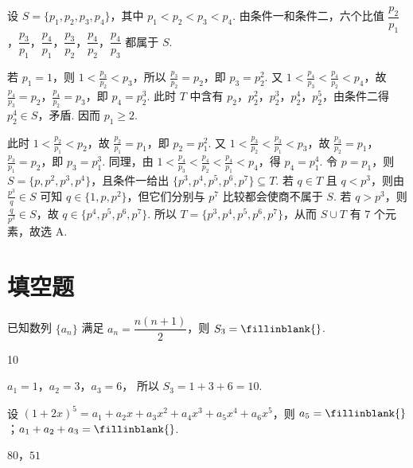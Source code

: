 \begin{solution}
设 \(S=\{p_1,p_2,p_3,p_4\}\)，其中 \(p_1<p_2<p_3<p_4\). 由条件一和条件二，六个比值
\(\dfrac{p_2}{p_1}\)，\(\dfrac{p_3}{p_1}\)，\(\dfrac{p_4}{p_1}\)，\(\dfrac{p_3}{p_2}\)，\(\dfrac{p_4}{p_2}\)，\(\dfrac{p_4}{p_3}\)
都属于 \(S\).

若 \(p_1=1\)，则 \(1<\frac{p_3}{p_2}<p_3\)，所以 \(\frac{p_3}{p_2}=p_2\)，即 \(p_3=p_2^2\). 又
\(1<\frac{p_4}{p_3}<\frac{p_4}{p_2}<p_4\)，故 \(\frac{p_4}{p_3}=p_2\)，\(\frac{p_4}{p_2}=p_3\)，即 \(p_4=p_2^3\). 此时 \(T\) 中含有 \(p_2\)，\(p_2^2\)，\(p_2^3\)，\(p_2^4\)，\(p_2^5\)，由条件二得 \(p_2^4\in S\)，矛盾. 因而 \(p_1\ge2\).

此时 \(1<\frac{p_2}{p_1}<p_2\)，故 \(\frac{p_2}{p_1}=p_1\)，即 \(p_2=p_1^2\). 又
\(1<\frac{p_3}{p_2}<\frac{p_3}{p_1}<p_3\)，故 \(\frac{p_3}{p_2}=p_1\)，\(\frac{p_3}{p_1}=p_2\)，即 \(p_3=p_1^3\). 同理，由
\(1<\frac{p_4}{p_3}<\frac{p_4}{p_2}<\frac{p_4}{p_1}<p_4\)，得 \(p_4=p_1^4\).
令 \(p=p_1\)，则 \(S=\{p,p^2,p^3,p^4\}\)，且条件一给出
\(\{p^3,p^4,p^5,p^6,p^7\}\subseteq T\).
若 \(q\in T\) 且 \(q<p^3\)，则由 \(\frac{p^3}{q}\in S\) 可知 \(q\in\{1,p,p^2\}\)，但它们分别与 \(p^7\) 比较都会使商不属于 \(S\). 若 \(q>p^3\)，则 \(\frac{q}{p^3}\in S\)，故 \(q\in\{p^4,p^5,p^6,p^7\}\). 所以 \(T=\{p^3,p^4,p^5,p^6,p^7\}\)，从而 \(S\cup T\) 有 \(7\) 个元素，故选 A.
\end{solution}
\section{填空题}

\begin{problem}
已知数列 \(\{a_n\}\) 满足 \(a_n=\dfrac{n(n+1)}{2}\)，则 \(S_3=\fillinblank{}\).
\end{problem}

\begin{answer}
10
\end{answer}

\begin{solution}
\(a_1=1\)，\(a_2=3\)，\(a_3=6\)，
所以
\(S_3=1+3+6=10\).
\end{solution}

\begin{problem}
设 \((1+2x)^5=a_1+a_2x+a_3x^2+a_4x^3+a_5x^4+a_6x^5\)，则 \(a_5=\fillinblank{}\)；\(a_1+a_2+a_3=\fillinblank{}\).
\end{problem}

\begin{answer}
\(80\)，\(51\)
\end{answer}

